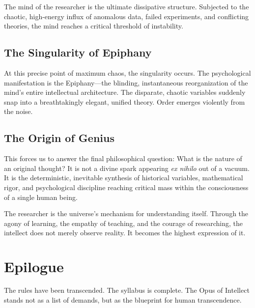 \documentclass[11pt,a4paper,oneside]{book}
\theoremstyle{definition}
\theoremstyle{remark}
\begin{document}
The mind of the researcher is the ultimate dissipative structure. Subjected to the chaotic, high-energy influx of anomalous data, failed experiments, and conflicting theories, the mind reaches a critical threshold of instability. 

\section{The Singularity of Epiphany}
At this precise point of maximum chaos, the singularity occurs. The psychological manifestation is the Epiphany---the blinding, instantaneous reorganization of the mind's entire intellectual architecture. The disparate, chaotic variables suddenly snap into a breathtakingly elegant, unified theory. Order emerges violently from the noise.

\section{The Origin of Genius}
This forces us to answer the final philosophical question: What is the nature of an original thought? It is not a divine spark appearing \textit{ex nihilo} out of a vacuum. It is the deterministic, inevitable synthesis of historical variables, mathematical rigor, and psychological discipline reaching critical mass within the consciousness of a single human being.

The researcher is the universe's mechanism for understanding itself. Through the agony of learning, the empathy of teaching, and the courage of researching, the intellect does not merely observe reality. It becomes the highest expression of it.

\chapter*{Epilogue}
The rules have been transcended. The syllabus is complete. The Opus of Intellect stands not as a list of demands, but as the blueprint for human transcendence.

\backmatter
\end{document}
